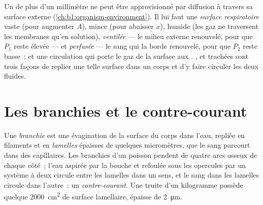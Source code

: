 \begin{proposition}\label{prop:b1:gas-exchange:requirements}
Un  de plus d'un millimètre ne peut être approvisionné par
diffusion à travers sa surface externe
(\cref{ch:b1:organism-environment}). Il lui faut une \emph{surface
respiratoire} vaste (pour augmenter $A$), mince (pour abaisser $x$),
humide (les gaz ne traversent les membranes qu'en solution),
\emph{ventilée} --- le milieu externe renouvelé, pour que $P_1$ reste
élevée --- et \emph{perfusée} --- le sang qui la borde renouvelé, pour
que $P_2$ reste basse~; et une circulation qui porte le gaz de la
surface aux . ,  et trachées sont trois façons
de replier une telle surface dans un corps et d'y faire circuler les
deux fluides.
\end{proposition}

\section{Les branchies et le contre-courant}

\begin{definition}[Branchie]\label{def:b1:gas-exchange:gill}
Une \emph{branchie} est une évagination de la surface du corps dans
l'eau, repliée en filaments et en \emph{lamelles} épaisses de quelques
micromètres, que le sang parcourt dans des capillaires. Les branchies
d'un poisson pendent de quatre arcs osseux de chaque côté~; l'eau
aspirée par la bouche et refoulée sous les opercules par un système à
deux  circule entre les lamelles dans un sens, et le sang dans
les lamelles circule dans l'autre~: un
\emph{contre-courant}. Une truite d'un
kilogramme possède quelque \qty{2000}{cm^2} de surface lamellaire,
épaisse de \qty{2}{\micro m}.
\end{definition}

